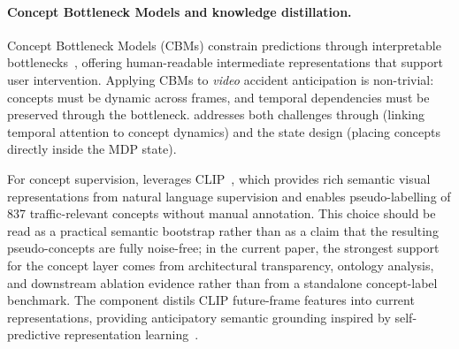 \paragraph{Concept Bottleneck Models and knowledge distillation.}
Concept Bottleneck Models (CBMs) constrain predictions through interpretable
bottlenecks~\citep{ref102}, offering human-readable intermediate representations
that support user intervention.
Applying CBMs to \emph{video} accident anticipation is non-trivial:
concepts must be dynamic across frames, and temporal dependencies must be
preserved through the bottleneck.
\method{} addresses both challenges through \cgta{} (linking temporal
attention to concept dynamics) and the \caac{} state design (placing
concepts directly inside the MDP state).

For concept supervision, \method{} leverages CLIP~\citep{radford2021learning},
which provides rich semantic visual representations from natural language
supervision and enables pseudo-labelling of 837 traffic-relevant concepts
without manual annotation. This choice should be read as a practical semantic
bootstrap rather than as a claim that the resulting pseudo-concepts are fully
noise-free; in the current paper, the strongest support for the concept layer
comes from architectural transparency, ontology analysis, and downstream
ablation evidence rather than from a standalone concept-label benchmark.
The \tsd{} component distils CLIP future-frame features into current
representations, providing anticipatory semantic grounding inspired by
self-predictive representation learning~\citep{fang2022traffic}.
